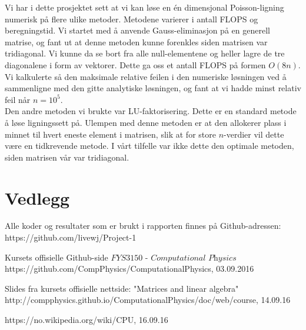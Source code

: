 \documentclass{article}
\begin{document}
Vi har i dette prosjektet sett at vi kan løse en én dimensjonal Poisson-ligning numerisk på flere ulike metoder. Metodene varierer i antall FLOPS og beregningstid. Vi startet med å anvende Gauss-eliminasjon på en generell matrise, og fant ut at denne metoden kunne forenkles siden matrisen var tridiagonal. Vi kunne da se bort fra alle null-elementene og heller lagre de tre diagonalene i form av vektorer. Dette ga oss et antall FLOPS på formen $O(8n)$. Vi kalkulerte så den maksimale relative feilen i den numeriske løsningen ved å sammenligne med den gitte analytiske løsningen, og fant at vi hadde minst relativ feil når $n=10^5$. \\

Den andre metoden vi brukte var LU-faktorisering. Dette er en standard metode å løse ligningssett på. Ulempen med denne metoden er at den allokerer plass i minnet til hvert eneste element i matrisen, slik at for store $n$-verdier vil dette være en tidkrevende metode. I vårt tilfelle var ikke dette den optimale metoden, siden matrisen vår var tridiagonal.


\section{Vedlegg}
Alle koder og resultater som er brukt i rapporten finnes på Github-adressen: https://github.com/livewj/Project-1




\begin{thebibliography}{9}

  Kursets offisielle Github-side $\textit{FYS3150 - Computational Physics}$
  https://github.com/CompPhysics/ComputationalPhysics,
  03.09.2016  
  
\bibitem{}
  Slides fra kursets offisielle nettside: "Matrices and linear algebra" http://compphysics.github.io/ComputationalPhysics/doc/web/course, 14.09.16
  
\bibitem{}
 https://no.wikipedia.org/wiki/CPU, 16.09.16
    
\end{thebibliography}
\end{document}

